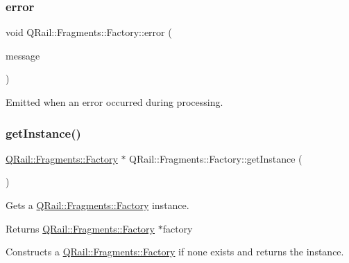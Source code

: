 \mbox{\label{classQRail_1_1Fragments_1_1Factory_a681785e7cb92638163ad326fbb3a0c84}} 
\subsubsection{\texorpdfstring{error}{error}}
{\footnotesize\ttfamily void Q\+Rail\+::\+Fragments\+::\+Factory\+::error (\begin{DoxyParamCaption}\item[{const Q\+String \&}]{message }\end{DoxyParamCaption})\hspace{0.3cm}{\ttfamily [signal]}}



Emitted when an error occurred during processing. 

\mbox{\label{classQRail_1_1Fragments_1_1Factory_a26ad4dba8c552d6a9920c5a8cbbc2af9}} 
\subsubsection{\texorpdfstring{getInstance()}{getInstance()}}
{\footnotesize\ttfamily \mbox{\hyperlink{classQRail_1_1Fragments_1_1Factory}{Q\+Rail\+::\+Fragments\+::\+Factory}} $\ast$ Q\+Rail\+::\+Fragments\+::\+Factory\+::get\+Instance (\begin{DoxyParamCaption}{ }\end{DoxyParamCaption})\hspace{0.3cm}{\ttfamily [static]}}



Gets a \mbox{\hyperlink{classQRail_1_1Fragments_1_1Factory}{Q\+Rail\+::\+Fragments\+::\+Factory}} instance. 

\begin{DoxyReturn}{Returns}
\mbox{\hyperlink{classQRail_1_1Fragments_1_1Factory}{Q\+Rail\+::\+Fragments\+::\+Factory}} $\ast$factory
\end{DoxyReturn}
Constructs a \mbox{\hyperlink{classQRail_1_1Fragments_1_1Factory}{Q\+Rail\+::\+Fragments\+::\+Factory}} if none exists and returns the instance. \mbox{\label{classQRail_1_1Fragments_1_1Factory_ae603b69714d209caee04f7024c39548b}} 
